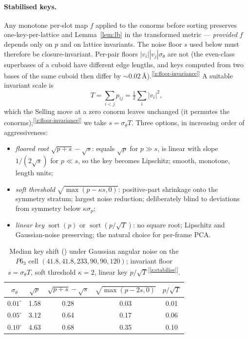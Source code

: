 \documentclass[11pt]{article}
\newcommand{\Ang}{\text{\AA}}
\newcommand{\chk}[1]{\textsuperscript{[\ref{#1}]}}
\begin{document}
\paragraph{Stabilised keys.}
Any monotone per-slot map $f$ applied to the conorms before sorting preserves one-key-per-lattice and Lemma~\ref{lem:lb} in the transformed metric --- \emph{provided} $f$ depends only on $p$ and on lattice invariants. The noise floor $s$ used below must therefore be closure-invariant. Per-pair floors $|v_i||v_j|\sigma_\theta$ are not (the even-class superbases of a cuboid have different edge lengths, and keys computed from two bases of the same cuboid then differ by $\sim0.02\,\Ang$).\chk{z:floor-invariance} A suitable invariant scale is
\[
T=\sum_{i<j}p_{ij}=\tfrac12\sum_i|v_i|^2 ,
\]
which the Selling move at a zero conorm leaves unchanged (it permutes the conorms);\chk{z:floor-invariance} we take $s=\sigma_\theta T$. Three options, in increasing order of aggressiveness:
\begin{itemize}
\item \emph{floored root} $\sqrt{p+s}-\sqrt s$: equals $\sqrt p$ for $p\gg s$, is linear with slope $1/(2\sqrt s)$ for $p\ll s$, so the key becomes Lipschitz; smooth, monotone, length units;
\item \emph{soft threshold} $\sqrt{\max(p-\kappa s,0)}$: positive-part shrinkage onto the symmetry stratum; largest noise reduction; deliberately blind to deviations from symmetry below $\kappa\sigma_p$;
\item \emph{linear key} $\operatorname{sort}(p)$ or $\operatorname{sort}(p/\sqrt T)$: no square root; Lipschitz and Gaussian-noise preserving; the natural choice for per-frame PCA.
\end{itemize}

\begin{table}[h]
\centering
\caption{Median key shift (\Ang) under Gaussian angular noise on the $P6_3$ cell $(41.8,41.8,233,90,90,120)$; invariant floor $s=\sigma_\theta T$, soft threshold $\kappa=2$, linear key $p/\sqrt T$\chk{z:stabilise}.}
\label{tab:noise}
\begin{tabular}{ccccc}
\toprule
$\sigma_\theta$ & $\sqrt p$ & $\sqrt{p+s}-\sqrt s$ & $\sqrt{\max(p-2s,0)}$ & $p/\sqrt T$ \\
\midrule
$0.01^\circ$ & 1.58 & 0.28 & 0.03 & 0.01 \\
$0.05^\circ$ & 3.12 & 0.64 & 0.17 & 0.06 \\
$0.10^\circ$ & 4.63 & 0.68 & 0.35 & 0.10 \\
\bottomrule
\end{tabular}
\end{table}
\end{document}
